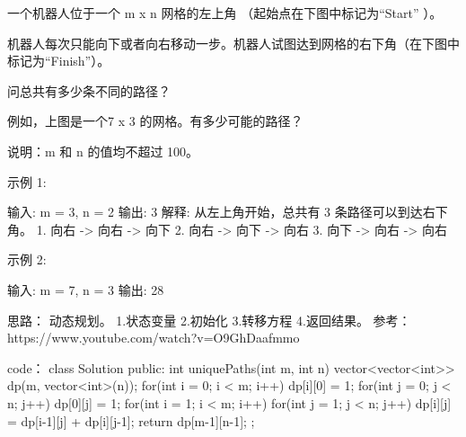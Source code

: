 一个机器人位于一个 m x n 网格的左上角 （起始点在下图中标记为“Start” ）。

机器人每次只能向下或者向右移动一步。机器人试图达到网格的右下角（在下图中标记为“Finish”）。

问总共有多少条不同的路径？

例如，上图是一个7 x 3 的网格。有多少可能的路径？

说明：m 和 n 的值均不超过 100。

示例 1:

输入: m = 3, n = 2
输出: 3
解释:
从左上角开始，总共有 3 条路径可以到达右下角。
1. 向右 -> 向右 -> 向下
2. 向右 -> 向下 -> 向右
3. 向下 -> 向右 -> 向右

示例 2:

输入: m = 7, n = 3
输出: 28


























思路：
动态规划。
1.状态变量
2.初始化
3.转移方程
4.返回结果。
参考： https://www.youtube.com/watch?v=O9GhDaafmmo




























code：
class Solution {
public:
    int uniquePaths(int m, int n) {
        vector<vector<int>> dp(m, vector<int>(n));
        for(int i = 0; i < m; i++)
            dp[i][0] = 1;
        for(int j = 0; j < n; j++)
            dp[0][j] = 1;
        for(int i = 1; i < m; i++)
        {
            for(int j = 1; j < n; j++)
            {
                dp[i][j] = dp[i-1][j] + dp[i][j-1];
            }
        }
        return dp[m-1][n-1];
    }
};